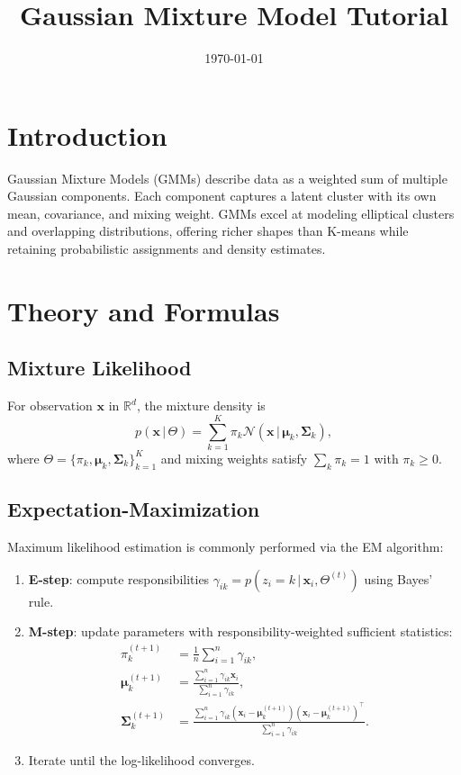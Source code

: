 ﻿\documentclass[12pt]{article}
\title{Gaussian Mixture Model Tutorial}
\author{}
\date{\today}
\begin{document}
\maketitle

\section{Introduction}
Gaussian Mixture Models (GMMs) describe data as a weighted sum of multiple Gaussian components. Each component captures a latent cluster with its own mean, covariance, and mixing weight. GMMs excel at modeling elliptical clusters and overlapping distributions, offering richer shapes than K-means while retaining probabilistic assignments and density estimates.

\section{Theory and Formulas}
\subsection{Mixture Likelihood}
For observation \(\mathbf{x}\) in \(\mathbb{R}^d\), the mixture density is
\begin{equation}
p(\mathbf{x}\,|\,\Theta) = \sum_{k=1}^K \pi_k \mathcal{N}(\mathbf{x} \,|\, \bm{\mu}_k, \mathbf{\Sigma}_k),
\end{equation}
where \(\Theta = \{\pi_k, \bm{\mu}_k, \mathbf{\Sigma}_k\}_{k=1}^K\) and mixing weights satisfy \(\sum_k \pi_k = 1\) with \(\pi_k \ge 0\).

\subsection{Expectation-Maximization}
Maximum likelihood estimation is commonly performed via the EM algorithm:
\begin{enumerate}
  \item \textbf{E-step}: compute responsibilities \(\gamma_{ik} = p(z_i = k \,|\, \mathbf{x}_i, \Theta^{(t)})\) using Bayes' rule.
  \item \textbf{M-step}: update parameters with responsibility-weighted sufficient statistics:
  \begin{align}
  \pi_k^{(t+1)} &= \frac{1}{n} \sum_{i=1}^n \gamma_{ik},\\
  \bm{\mu}_k^{(t+1)} &= \frac{\sum_{i=1}^n \gamma_{ik} \mathbf{x}_i}{\sum_{i=1}^n \gamma_{ik}},\\
  \mathbf{\Sigma}_k^{(t+1)} &= \frac{\sum_{i=1}^n \gamma_{ik} (\mathbf{x}_i - \bm{\mu}_k^{(t+1)})(\mathbf{x}_i - \bm{\mu}_k^{(t+1)})^\top}{\sum_{i=1}^n \gamma_{ik}}.
  \end{align}
  \item Iterate until the log-likelihood converges.
\end{enumerate}
\end{document}
